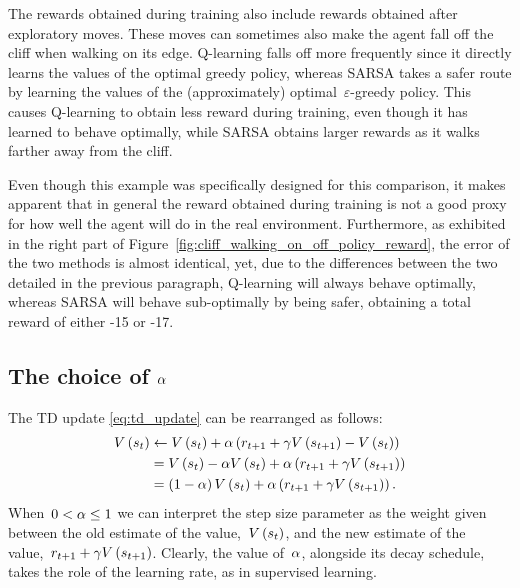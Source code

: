 The rewards obtained during training also include rewards obtained after exploratory moves. These moves can sometimes also make the agent fall off the cliff when walking on its edge. Q-learning falls off more frequently since it directly learns the values of the optimal greedy policy, whereas SARSA takes a safer route by learning the values of the (approximately) optimal~${\varepsilon}$-greedy policy. This causes Q-learning to obtain less reward during training, even though it has learned to behave optimally, while SARSA obtains larger rewards as it walks farther away from the cliff.

Even though this example was specifically designed for this comparison, it makes apparent that in general the reward obtained during training is not a good proxy for how well the agent will do in the real environment. Furthermore, as exhibited in the right part of Figure~\ref{fig:cliff_walking_on_off_policy_reward}, the error of the two methods is almost identical, yet, due to the differences between the two detailed in the previous paragraph, Q-learning will always behave optimally, whereas SARSA will behave sub-optimally by being safer, obtaining a total reward of either -15 or -17.

\subsection{The choice of \texorpdfstring{${\alpha}$}{alpha}}
The TD update \eqref{eq:td_update} can be rearranged as follows:
\begin{align}
	\estimatestatevalue\left(\randomstate_{\timestep}\right)
		&\gets\estimatestatevalue\left(\randomstate_{\timestep}\right)+\robbinsmonro\left(\randomreward_{\timestep+1}+\discount\estimatestatevalue\left(\randomstate_{\timestep+1}\right)-\estimatestatevalue\left(\randomstate_{\timestep}\right)\right) \notag \\
		&=\estimatestatevalue\left(\randomstate_{\timestep}\right)-\robbinsmonro\estimatestatevalue\left(\randomstate_{\timestep}\right)+\robbinsmonro\left(\randomreward_{\timestep+1}+\discount\estimatestatevalue\left(\randomstate_{t+1}\right)\right) \notag \\
		&=\left(1-\robbinsmonro\right)\estimatestatevalue\left(\randomstate_{\timestep}\right)+\robbinsmonro\left(\randomreward_{\timestep+1}+\discount\estimatestatevalue\left(\randomstate_{\timestep+1}\right)\right).
\end{align}
When~${0<\alpha\leq1}$ we can interpret the step size parameter as the weight given between the old estimate of the value,~${\estimatestatevalue\left(\randomstate_{\timestep}\right)}$, and the new estimate of the value,~${\randomreward_{\timestep+1}+\discount\estimatestatevalue\left(\randomstate_{\timestep+1}\right)}$. Clearly, the value of~${\alpha}$, alongside its decay schedule, takes the role of the learning rate, as in supervised learning.

